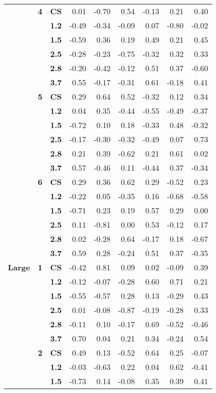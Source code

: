 \begin{table}[htp]
\begin{center}
\begin{tabular}{>{\bfseries}c>{\bfseries}c>{\bfseries}crrrrrr}
 & 4 & CS & 0.01 & -0.70 & 0.54 & -0.13 & 0.21 & 0.40\\
 &  & 1.2 & -0.49 & -0.34 & -0.09 & 0.07 & -0.80 & -0.02\\
 &  & 1.5 & -0.59 & 0.36 & 0.19 & 0.49 & 0.21 & 0.45\\
 &  & 2.5 & -0.28 & -0.23 & -0.75 & -0.32 & 0.32 & 0.33\\
 &  & 2.8 & -0.20 & -0.42 & -0.12 & 0.51 & 0.37 & -0.60\\
 &  & 3.7 & 0.55 & -0.17 & -0.31 & 0.61 & -0.18 & 0.41\\\cmidrule{2-9}
  & 5 & CS & 0.29 & 0.64 & 0.52 & -0.32 & 0.12 & 0.34\\
 &  & 1.2 & 0.04 & 0.35 & -0.44 & -0.55 & -0.49 & -0.37\\
 &  & 1.5 & -0.72 & 0.10 & 0.18 & -0.33 & 0.48 & -0.32\\
 &  & 2.5 & -0.17 & -0.30 & -0.32 & -0.49 & 0.07 & 0.73\\
 &  & 2.8 & 0.21 & 0.39 & -0.62 & 0.21 & 0.61 & 0.02\\
 &  & 3.7 & 0.57 & -0.46 & 0.11 & -0.44 & 0.37 & -0.34\\\cmidrule{2-9}
  & 6 & CS & 0.29 & 0.36 & 0.62 & 0.29 & -0.52 & 0.23\\
 &  & 1.2 & -0.22 & 0.05 & -0.35 & 0.16 & -0.68 & -0.58\\
 &  & 1.5 & -0.71 & 0.23 & 0.19 & 0.57 & 0.29 & 0.00\\
 &  & 2.5 & 0.11 & -0.81 & 0.00 & 0.53 & -0.12 & 0.17\\
 &  & 2.8 & 0.02 & -0.28 & 0.64 & -0.17 & 0.18 & -0.67\\
 &  & 3.7 & 0.59 & 0.28 & -0.24 & 0.51 & 0.37 & -0.35\\
\midrule
Large & 1 & CS & -0.42 & 0.81 & 0.09 & 0.02 & -0.09 & 0.39\\
 &  & 1.2 & -0.12 & -0.07 & -0.28 & 0.60 & 0.71 & 0.21\\
 &  & 1.5 & -0.55 & -0.57 & 0.28 & 0.13 & -0.29 & 0.43\\
 &  & 2.5 & 0.01 & -0.08 & -0.87 & -0.19 & -0.28 & 0.33\\
 &  & 2.8 & -0.11 & 0.10 & -0.17 & 0.69 & -0.52 & -0.46\\
 &  & 3.7 & 0.70 & 0.04 & 0.21 & 0.34 & -0.24 & 0.54\\\cmidrule{2-9}
 & 2 & CS & 0.49 & 0.13 & -0.52 & 0.64 & 0.25 & -0.07\\
 &  & 1.2 & -0.03 & -0.63 & 0.22 & 0.04 & 0.62 & -0.41\\
 &  & 1.5 & -0.73 & 0.14 & -0.08 & 0.35 & 0.39 & 0.41\\

\end{tabular}
\end{center}
\end{table}
